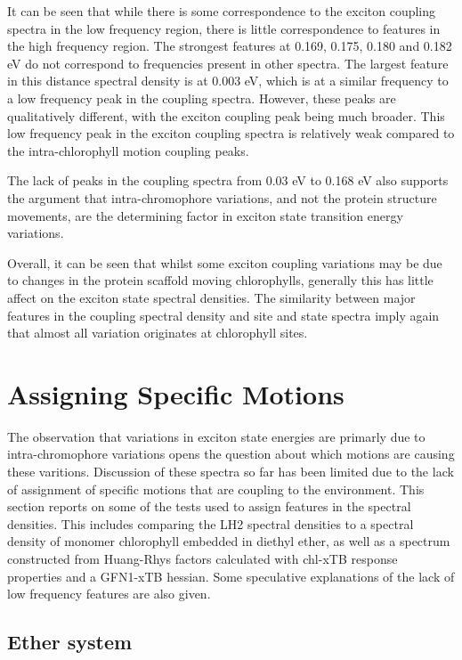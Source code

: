 It can be seen that while there is some correspondence to the exciton coupling spectra 
in the low frequency region, there is little correspondence to features in the high
frequency region. The strongest features at 0.169, 0.175, 0.180 and 0.182 eV do
not correspond to frequencies present in other spectra. The largest feature in
this distance spectral density is at 0.003 eV, which is at a similar frequency to a
low frequency peak in the coupling spectra. However, these peaks are qualitatively 
different, with the exciton coupling peak being much broader. This low frequency
peak in the exciton coupling spectra is relatively weak compared to the intra-chlorophyll
motion coupling peaks.

The lack of peaks in the coupling spectra from 0.03 eV to 0.168 eV also supports
the argument that intra-chromophore variations, and not the protein structure movements,
are the determining factor in exciton state transition energy variations.

Overall, it can be seen that whilst some exciton coupling variations may be due to
changes in the protein scaffold moving chlorophylls, generally this has little affect
on the exciton state spectral densities. The similarity between major features in 
the coupling spectral density and site and state spectra imply again that almost 
all variation originates at chlorophyll sites.

\afterpartskip
\section{Assigning Specific Motions}
\label{sec:monomer_dimer_assign}

The observation that variations in exciton state energies are primarly due to intra-chromophore 
variations opens the question about which motions are causing these varitions. Discussion
of these spectra so far has been limited due to the lack of assignment of specific
motions that are coupling to the environment. This section reports on some of the
tests used to assign features in the spectral densities. This includes comparing
the LH2 spectral densities to a spectral density of monomer chlorophyll embedded
in diethyl ether, as well as a spectrum constructed from Huang-Rhys factors calculated
with chl-xTB response properties and a GFN1-xTB hessian. Some speculative explanations
of the lack of low frequency features are also given.

\subsection{Ether system}
\label{subsec:specdens_ether}

